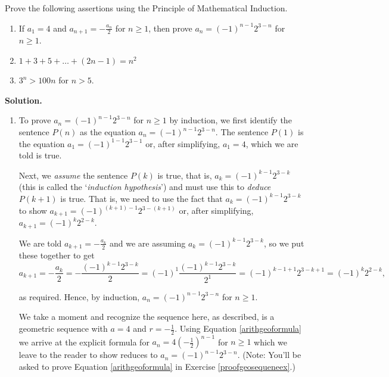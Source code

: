 \documentclass{ximera}
\begin{document}
\begin{example} \label{inductionex01}  Prove the following assertions using the Principle of Mathematical Induction.

\begin{enumerate}


\item If $a_{1} = 4$ and $a_{n+1} = -\frac{a_{n}}{2}$ for $n \geq 1$,  then prove $a_{n} = (-1)^{n-1} 2^{3-n}$ for $n \geq 1$.

\item $1 + 3 + 5 + \ldots + (2n-1) = n^2$

\item  $3^{n} > 100n$ for $n > 5$.


\end{enumerate}


{\bf Solution.}

\begin{enumerate}

\item To prove $a_{n} = (-1)^{n-1} 2^{3-n}$ for $n \geq 1$ by induction, we first identify the sentence $P(n)$ as the equation $a_{n} = (-1)^{n-1} 2^{3-n}$.  The sentence $P(1)$ is the equation $a_{1} = (-1)^{1-1}2^{3-1}$ or, after simplifying,  $a_{1} = 4$, which we are told is true.
 
 Next, we \textit{assume} the sentence $P(k)$ is true, that is, $a_{k}= (-1)^{k-1} 2^{3-k}$ (this is called the `\textit{induction hypothesis}') and must use this to \textit{deduce} $P(k+1)$ is true. That is, we need to use the fact that  $a_{k}= (-1)^{k-1} 2^{3-k}$ to show $a_{k+1} = (-1)^{(k+1)-1}2^{3-(k+1)}$ or, after simplifying, $a_{k+1} = (-1)^{k} 2^{2-k}$.
 
 We are told $a_{k+1} =  -\frac{a_{k}}{2}$ and we are assuming $a_{k}= (-1)^{k-1} 2^{3-k}$, so we put these together to get \[ a_{k+1} =  -\frac{a_{k}}{2} =  -\frac{(-1)^{k-1} 2^{3-k}}{2}  = (-1)^{1} \frac{(-1)^{k-1} 2^{3-k}}{2^{1}}=  (-1)^{k-1+1} 2^{3-k+1} = (-1)^{k} 2^{2-k},\]
 
 as required.  Hence, by induction, $a_{n} = (-1)^{n-1} 2^{3-n}$ for $n \geq 1$.

We take a moment and recognize the sequence here, as described, is a geometric sequence with $a = 4$ and $r  = -\frac{1}{2}$.  Using Equation \ref{arithgeoformula} we arrive at the explicit formula for $a_{n} = 4 \left(- \frac{1}{2} \right)^{n-1}$ for $n \geq 1$ which we leave to the reader to show reduces to  $a_{n} = (-1)^{n-1} 2^{3-n}$.    (Note: You'll be asked to prove Equation \ref{arithgeoformula}  in Exercise \ref{proofgeosequeneex}.)


\end{enumerate}
\end{example}
\end{document}
